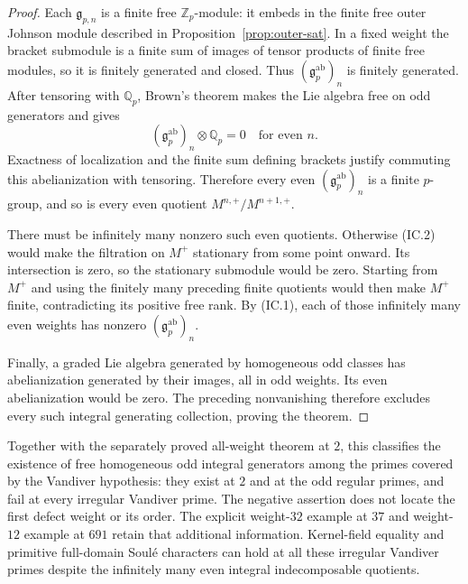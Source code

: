 \begin{proof}
Each $\mathfrak g_{p,n}$ is a finite free $\mathbb Z_p$-module:
it embeds in the finite free outer Johnson module described in
Proposition~\ref{prop:outer-sat}.  In a fixed weight the bracket
submodule is a finite sum of images of tensor products of finite
free modules, so it is finitely generated and closed.  Thus
$(\mathfrak g_p^{\mathrm{ab}})_n$ is finitely generated.
After tensoring with $\mathbb Q_p$, Brown's theorem makes the
Lie algebra free on odd generators and gives
\[
 (\mathfrak g_p^{\mathrm{ab}})_n\otimes\mathbb Q_p=0
 \quad\text{for even }n.
\]
Exactness of localization and the finite sum defining brackets
justify commuting this abelianization with tensoring.
Therefore every even $(\mathfrak g_p^{\mathrm{ab}})_n$ is a
finite $p$-group, and so is every even quotient
$M^{n,+}/M^{n+1,+}$.

There must be infinitely many nonzero such even quotients.
Otherwise (IC.2) would make the filtration on $M^+$ stationary
from some point onward.  Its intersection is zero, so the
stationary submodule would be zero.  Starting from $M^+$ and
using the finitely many preceding finite quotients would then
make $M^+$ finite, contradicting its positive free rank.
By (IC.1), each of those infinitely many even weights has
nonzero $(\mathfrak g_p^{\mathrm{ab}})_n$.

Finally, a graded Lie algebra generated by homogeneous odd
classes has abelianization generated by their images, all in odd
weights.  Its even abelianization would be zero.  The preceding
nonvanishing therefore excludes every such integral generating
collection, proving the theorem.
\end{proof}

Together with the separately proved all-weight theorem at $2$,
this classifies the existence of free homogeneous odd integral
generators among the primes covered by the Vandiver hypothesis:
they exist at $2$ and at the odd regular primes, and fail at every
irregular Vandiver prime.  The negative assertion does not locate
the first defect weight or its order.  The explicit weight-$32$
example at $37$ and weight-$12$ example at $691$ retain that
additional information.  Kernel-field equality and primitive
full-domain Soul\'e characters can hold at all these irregular
Vandiver primes despite the infinitely many even integral
indecomposable quotients.
